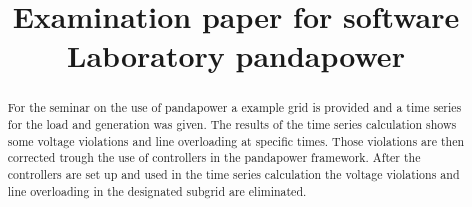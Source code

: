 \documentclass[conference]{IEEEtran}
\begin{document}
\title{Examination paper for software Laboratory pandapower}

\author{
}

\maketitle

\begin{abstract}
For the seminar on the use of pandapower a example grid is provided and a time series for the load and generation was given. The results of the time series calculation shows some voltage violations and line overloading at specific times. Those violations are then corrected trough the use of controllers in the pandapower framework. After the controllers are set up and used in the time series calculation the voltage violations and line overloading in the designated subgrid are eliminated.
\end{abstract}
\end{document}
